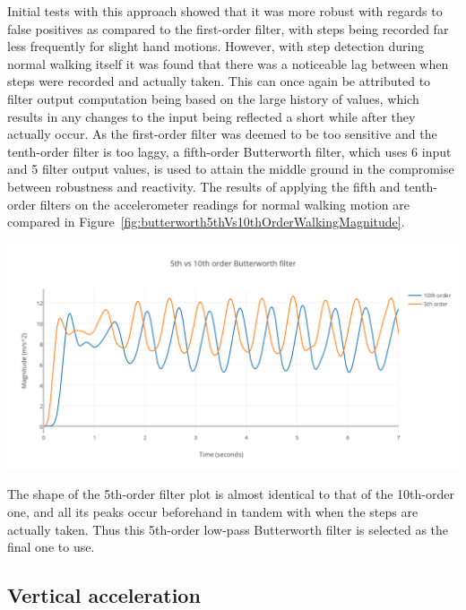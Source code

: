 \documentclass[main.tex]{subfiles}
\begin{document}
Initial tests with this approach showed that it was more robust with regards to false positives as compared to the first-order filter, with steps being recorded far less frequently for slight hand motions. However, with step detection during normal walking itself it was found that there was a noticeable lag between when steps were recorded and actually taken. This can once again be attributed to filter output computation being based on the large history of values, which results in any changes to the input being reflected a short while after they actually occur. As the first-order filter was deemed to be too sensitive and the tenth-order filter is too laggy, a fifth-order Butterworth filter, which uses 6 input and 5 filter output values, is used to attain the middle ground in the compromise between robustness and reactivity. The results of applying the fifth and tenth-order filters on the accelerometer readings for normal walking motion are compared in Figure~\ref{fig:butterworth5thVs10thOrderWalkingMagnitude}.  

\begin{center}
\includegraphics[scale=0.9]{images/butterworth5thVs10thOrderWalkingMagnitude.png}
\label{fig:butterworth5thVs10thOrderWalkingMagnitude}
\end{center}

The shape of the 5th-order filter plot is almost identical to that of the 10th-order one, and all its peaks occur beforehand in tandem with when the steps are actually taken. Thus this 5th-order low-pass Butterworth filter is selected as the final one to use. 

\subsection{Vertical acceleration}
\end{document}
